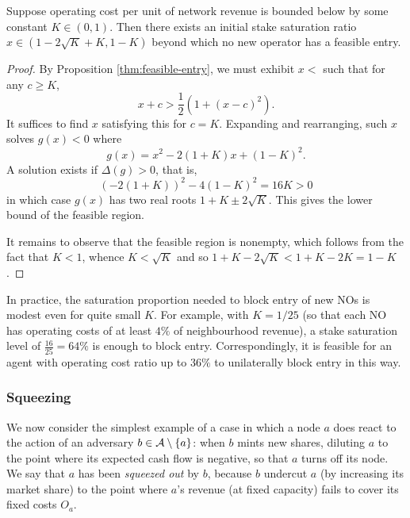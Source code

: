 \begin{corollary}
  \label{thm:entry-blocking-ratio}

  Suppose operating cost per unit of network revenue is bounded below by some constant $K\in(0,1)$.
  Then there exists an initial stake saturation ratio $x\in(1-2\sqrt{K}+K,1-K)$ beyond which no new operator has a feasible entry.

\end{corollary}
%
\begin{proof}

  By Proposition \ref{thm:feasible-entry}, we must exhibit $x<$ such that for any $c\geq K$,
  \[
    x + c > \frac{1}{2}(1 + (x-c)^2).
  \]
  It suffices to find $x$ satisfying this for $c=K$.
  Expanding and rearranging, such $x$ solves $g(x)<0$ where
  \[
    g(x) = x^2 - 2(1+K) x + (1-K)^2.
  \]
  A solution exists if $\Delta(g)>0$, that is,
  \[
    (-2(1+K))^2 - 4(1-K)^2  = 16K > 0
  \]
  in which case $g(x)$ has two real roots $1 + K \pm 2\sqrt{K}$.
  This gives the lower bound of the feasible region.
  
  It remains to observe that the feasible region is nonempty, which follows from the fact that $K<1$, whence $K<\sqrt{K}$ and so $1+K-2\sqrt{K}<1+K-2K=1-K$.\qedhere

\end{proof}

\begin{example}

  In practice, the saturation proportion needed to block entry of new NOs is modest even for quite small $K$.
  For example, with $K=1/25$ (so that each NO has operating costs of at least $4\%$ of neighbourhood revenue), a stake saturation level of $\frac{16}{25}=64\%$ is enough to block entry.
  Correspondingly, it is feasible for an agent with operating cost ratio up to $36\%$ to unilaterally block entry in this way.

\end{example}


\subsubsection{Squeezing}
\label{section:squeezing}

We now consider the simplest example of a case in which a node $a$ does react to the action of an adversary $b\in\mathcal{A}\setminus\{a\}$: when $b$ mints new shares, diluting $a$ to the point where its expected cash flow is negative, so that $a$ turns off its node.
%
We say that $a$ has been \emph{squeezed out} by $b$, because $b$ undercut $a$ (by increasing its market share) to the point where $a$'s revenue (at fixed capacity) fails to cover its fixed costs $O_a$.


